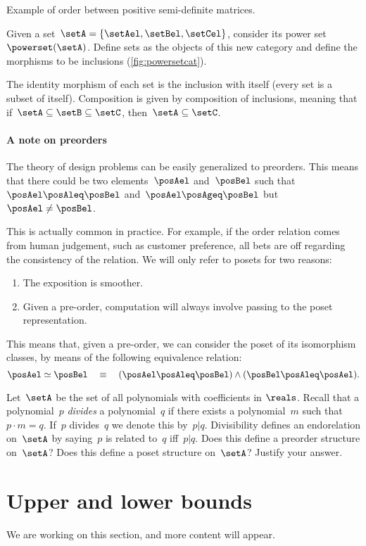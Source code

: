 \begin{marginfigure}
    \begin{center}
\end{center}
    \caption{Example of order between positive semi-definite matrices.}
    \label{fig:posdef_hasse}
\end{marginfigure}

  \begin{example}
    \label{ex:hasseinclusion}
    Given a set~$\setA=\{\setAel,\setBel,\setCel\}$, consider its power set~$\powerset(\setA)$.
    Define sets as the objects of this new category and define the morphisms to be inclusions (\cref{fig:powersetcat}).

    The identity morphism of each set is the inclusion with itself (every set is a subset of itself).
    Composition is given by composition of inclusions, meaning that if~$\setA\subseteq \setB \subseteq \setC$, then~$\setA\subseteq \setC$.
  \end{example}


\paragraph{A note on preorders}
The theory of design problems can be easily generalized to preorders.
This means that there could be two elements~$\posAel$ and~$\posBel$ such that~$\posAel\posAleq \posBel$ and~$\posAel \posAgeq \posBel$ but~$\posAel \neq \posBel$.

This is actually common in practice.
For example, if the order relation comes from human judgement, such as customer preference, all bets are off regarding the consistency of the relation.
We will only refer to posets for two reasons:
\begin{enumerate}
  \item The exposition is smoother.
  \item Given a pre-order, computation will always involve passing to the poset representation.
\end{enumerate}
This means that, given a pre-order, we can consider the poset of its isomorphism classes, by means of the following equivalence relation:
\begin{equation}
  \posAel \simeq \posBel \quad \equiv \quad (\posAel \posAleq \posBel) \wedge (\posBel \posAleq \posAel).
\end{equation}

\begin{gradedexercise}\label{ex:PolynomialDivisibility}
Let~$\setA$ be the set of all polynomials with coefficients in $\reals$.
Recall that a polynomial~$p$ \emph{divides} a polynomial~$q$ if there exists a polynomial~$m$ such that~$p \cdot m = q$.
If~$p$ divides~$q$ we denote this by~$p \vert q$.
Divisibility defines an endorelation on~$\setA$ by saying~$p$ is related to~$q$ iff~$p \vert q$.
Does this define a preorder structure on~$\setA$? Does this define a poset structure on~$\setA$? Justify your answer.
\end{gradedexercise}


\section{Upper and lower bounds}
We are working on this section, and more content will appear.
